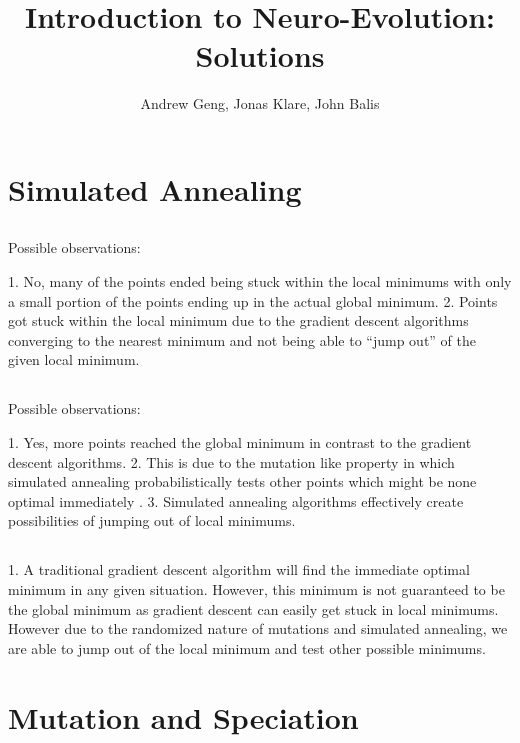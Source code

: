 \documentclass[12]{extarticle}
\begin{document}
\title{Introduction to Neuro-Evolution: Solutions}
\author{Andrew Geng, Jonas Klare, John Balis}




\maketitle





\section{Simulated Annealing}

\subsection{}
Possible observations:

1. No, many of the points ended being stuck within the local minimums with only a small portion of the points ending up in the actual global minimum.
2. Points got stuck within the local minimum due to the gradient descent algorithms converging to the nearest minimum and not being able to “jump out” of the given local minimum.

\subsection{}
Possible observations:

1. Yes, more points reached the global minimum in contrast to the gradient descent algorithms.
2. This is due to the mutation like property in which simulated annealing probabilistically tests other points which might be none optimal immediately .
3. Simulated annealing algorithms effectively create possibilities of jumping out of local minimums. 

\subsection{}

1. A traditional gradient descent algorithm will find the immediate optimal minimum in any given situation. However, this minimum is not guaranteed to be the global minimum as gradient descent can easily get stuck in local minimums. However due to the randomized nature of mutations and simulated annealing, we are able to jump out of the local minimum and test other possible minimums.

\section{Mutation and Speciation}
\end{document}
